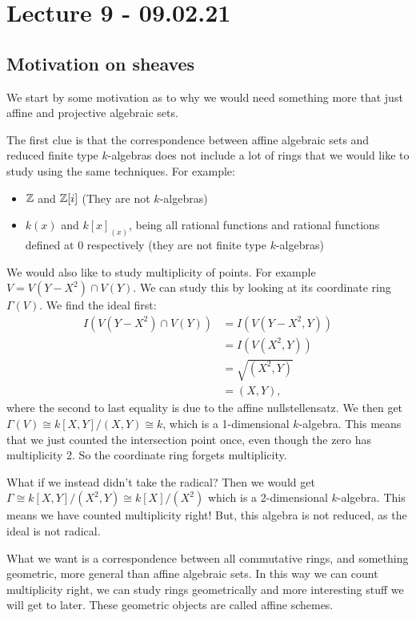 
\section{Lecture 9 - 09.02.21}

\subsection{Motivation on sheaves}

We start by some motivation as to why we would need something more that just affine and projective algebraic sets.

The first clue is that the correspondence between affine algebraic sets and reduced finite type $k$-algebras does not include a lot of rings that we would like to study using the same techniques. 
For example:
\begin{itemize}
    \item $\mathbb{Z}$ and $\mathbb{Z}[i]$ (They are not $k$-algebras)
    \item $k(x)$ and $k[x]_{(x)}$, being all rational functions and rational functions defined at $0$ respectively (they are not finite type  $k$-algebras)
\end{itemize}

We would also like to study multiplicity of points. For example $V=V(Y-X^2)\cap V(Y)$. We can study this by looking at its coordinate ring $\Gamma(V)$. We find the ideal first:
\begin{align*}
    I(V(Y-X^2)\cap V(Y))
    &= I(V(Y-X^2, Y)) \\
    &= I(V(X^2, Y)) \\
    &= \sqrt{(X^2, Y)} \\
    &= (X, Y), 
\end{align*}
where the second to last equality is due to the affine nullstellensatz. We then get $\Gamma(V) \cong k[X, Y]/(X, Y) \cong k$, which is a 1-dimensional $k$-algebra. This means that we just counted the intersection point once, even though the zero has multiplicity 2. So the coordinate ring forgets multiplicity. 

What if we instead didn't take the radical? Then we would get $\Gamma \cong k[X, Y]/(X^2, Y)\cong k[X]/(X^2)$ which is a 2-dimensional $k$-algebra. This means we have counted multiplicity right! But, this algebra is not reduced, as the ideal is not radical. 

What we want is a correspondence between all commutative rings, and something geometric, more general than affine algebraic sets. In this way we can count multiplicity right, we can study rings geometrically and more interesting stuff we will get to later. These geometric objects are called affine schemes. 

